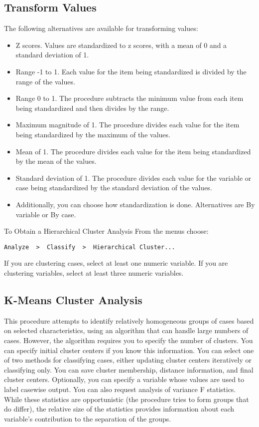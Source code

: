 \documentclass[a4paper,12pt]{article}
\begin{document}
\subsection*{Transform Values}
The following alternatives are available for transforming values:
\begin{itemize}
\item 	Z scores. Values are standardized to z scores, with a mean of 0 and a standard deviation of 1. 
\item 	Range -1 to 1. Each value for the item being standardized is divided by the range of the values. 
\item 	Range 0 to 1. The procedure subtracts the minimum value from each item being standardized and then divides by the range. 
\item 	Maximum magnitude of 1. The procedure divides each value for the item being standardized by the maximum of the values. 
\item 	Mean of 1. The procedure divides each value for the item being standardized by the mean of the values. 
\item 	Standard deviation of 1. The procedure divides each value for the variable or case being standardized by the standard deviation of the values.
\item Additionally, you can choose how standardization is done. Alternatives are By variable or By case.
\end{itemize}

To Obtain a Hierarchical Cluster Analysis
From the menus choose:
\begin{verbatim}
Analyze  >  Classify  >  Hierarchical Cluster...

\end{verbatim}
If you are clustering cases, select at least one numeric variable. If you are clustering variables, select at least three numeric variables. 


 
\subsection*{K-Means Cluster Analysis}
This procedure attempts to identify relatively homogeneous groups of cases based on selected characteristics, using an algorithm that can handle large numbers of cases. However, the algorithm requires you to specify the number of clusters. You can specify initial cluster centers if you know this information. You can select one of two methods for classifying cases, either updating cluster centers iteratively or classifying only. You can save cluster membership, distance information, and final cluster centers. Optionally, you can specify a variable whose values are used to label casewise output. You can also request analysis of variance F statistics. While these statistics are opportunistic (the procedure tries to form groups that do differ), the relative size of the statistics provides information about each variable's contribution to the separation of the groups.
\end{document}
